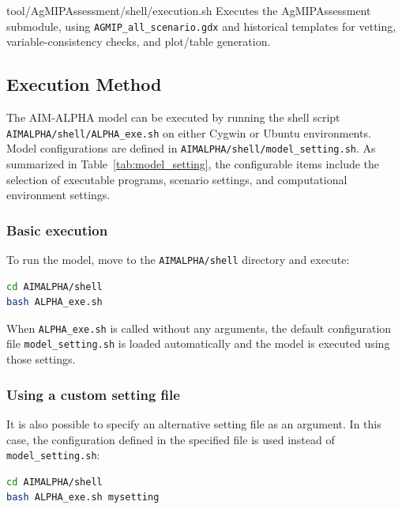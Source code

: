 \begin{programbox}{tool/AgMIPAssessment/shell/execution.sh}
Executes the AgMIPAssessment submodule, using \texttt{AGMIP\_all\_scenario.gdx} and historical templates for vetting, variable-consistency checks, and plot/table generation.
\end{programbox}


\clearpage

\subsection{Execution Method}

The AIM-ALPHA model can be executed by running the shell script 
\texttt{AIMALPHA/shell/ALPHA\_exe.sh} on either Cygwin or Ubuntu environments. \\
Model configurations are defined in \texttt{AIMALPHA/shell/model\_setting.sh}.  
As summarized in Table~\ref{tab:model_setting}, the configurable items include 
the selection of executable programs, scenario settings, and computational environment settings.

\subsubsection*{Basic execution}

To run the model, move to the \texttt{AIMALPHA/shell} directory and execute:

\begin{lstlisting}[language=bash]
cd AIMALPHA/shell
bash ALPHA_exe.sh
\end{lstlisting}

When \texttt{ALPHA\_exe.sh} is called without any arguments, 
the default configuration file \texttt{model\_setting.sh} is loaded automatically 
and the model is executed using those settings.

\subsubsection*{Using a custom setting file}

It is also possible to specify an alternative setting file as an argument.  
In this case, the configuration defined in the specified file is used instead of 
\texttt{model\_setting.sh}:

\begin{lstlisting}[language=bash]
cd AIMALPHA/shell
bash ALPHA_exe.sh mysetting
\end{lstlisting}

